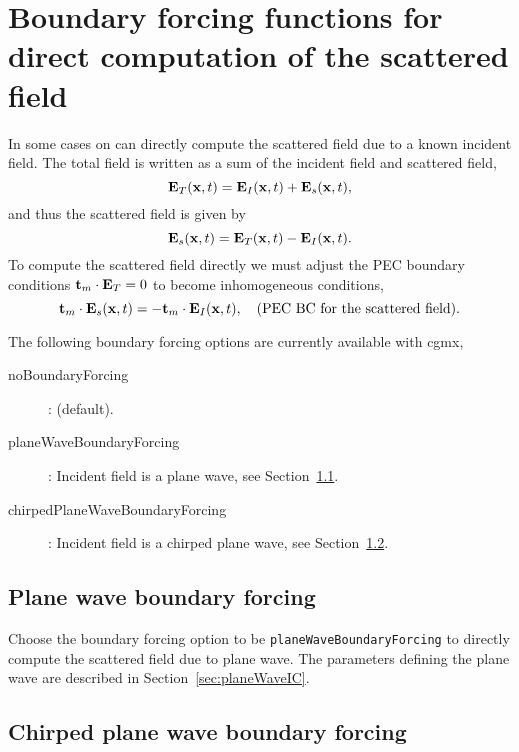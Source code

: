 \section{Boundary forcing functions for direct computation of the scattered field} \label{sec:boundaryForcings}



In some cases on can directly compute the scattered field due to a known incident field.
The total field is written as a sum of the incident field and scattered field,
\[
     \mathbf{ E}_T(\mathbf{ x},t) = \mathbf{ E}_I(\mathbf{ x},t) + \mathbf{ E}_s(\mathbf{ x},t),
\]
and thus the scattered field is given by
\[
     \mathbf{ E}_s(\mathbf{ x},t) = \mathbf{ E}_T(\mathbf{ x},t) -\mathbf{ E}_I(\mathbf{ x},t). 
\]
To compute the scattered field directly we must adjust the PEC boundary conditions $\mathbf{ t}_m\cdot\mathbf{ E}_T=0$ to
become inhomogeneous conditions, 
\[
    \mathbf{ t}_m\cdot \mathbf{ E}_s(\mathbf{ x},t) =  - \mathbf{ t}_m\cdot\mathbf{ E}_I(\mathbf{ x},t), \quad\text{(PEC BC for the scattered field)}. 
\]

\noindent The following boundary forcing options are currently available with cgmx,
\begin{description}
  \item[noBoundaryForcing]: (default).
  \item[planeWaveBoundaryForcing]: Incident field is a plane wave, see Section~\ref{sec:planeWaveBoundaryForcing}.
  \item[chirpedPlaneWaveBoundaryForcing]: Incident field is a chirped plane wave, see Section~\ref{sec:chirpedPlaneWaveBoundaryForcing}.
\end{description}


\subsection{Plane wave boundary forcing} \label{sec:planeWaveBoundaryForcing}

Choose the boundary forcing option to be {\tt planeWaveBoundaryForcing} to directly compute the 
scattered field due to plane wave. The parameters defining the plane wave are described
in Section~\ref{sec:planeWaveIC}.


\subsection{Chirped plane wave boundary forcing}\label{sec:chirpedPlaneWaveBoundaryForcing}


